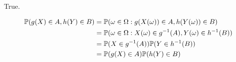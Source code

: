 
True. 

\begin{align*}
    \P(g(X) \in A, h(Y) \in B) &= \P( \omega \in \Omega: g(X(\omega)) \in A, h(Y(\omega)) \in B)\\
			       &= \P( \omega \in \Omega: X(\omega) \in g^{-1} (A), Y(\omega) \in
			       h^{-1} (B))\\
			       &= \P(X \in g^{-1} (A)) \P(Y \in h^{-1} (B)) \\
			       &= \P(g(X) \in A) \P(h(Y) \in B)
\end{align*}
